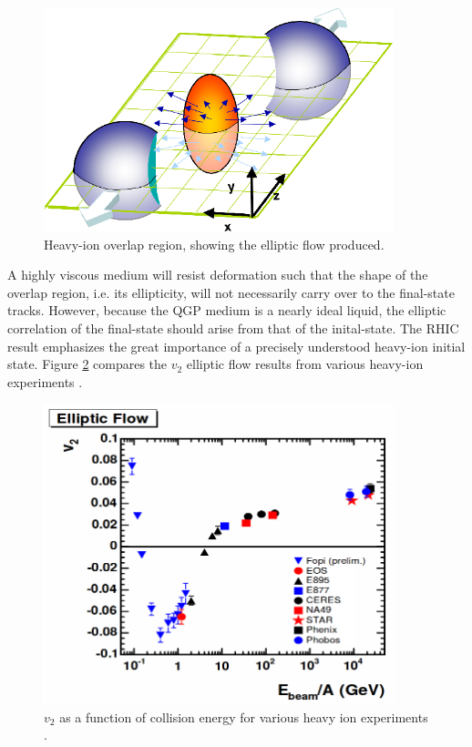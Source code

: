 \begin{figure}[h!]
\begin{centering}
\includegraphics[width=4in]{Chapter1/importfigs/elliptic_flow_3D_medium.png}
\par\end{centering}
\caption{Heavy-ion overlap region, showing the elliptic flow produced. \label{fig:overlap}}
\end{figure}
A highly viscous medium will resist deformation such that the shape of the overlap region, i.e. its ellipticity, will not necessarily carry over to the final-state tracks. However, because the QGP medium is a nearly ideal liquid, the elliptic correlation of the final-state should arise from that of the inital-state. The RHIC result emphasizes the great importance of a precisely understood heavy-ion initial state. Figure \ref{fig:hiFlow} compares the $v_2$ elliptic flow results from various heavy-ion experiments \cite{spsHI}.
\begin{figure}[h!]
\begin{centering}
\includegraphics[width=4in]{Chapter1/importfigs/elliptic_flow.png}
\par\end{centering}
\caption{$v_2$ as a function of collision energy for various heavy ion experiments \cite{spsHI}. \label{fig:hiFlow}}
\end{figure}

